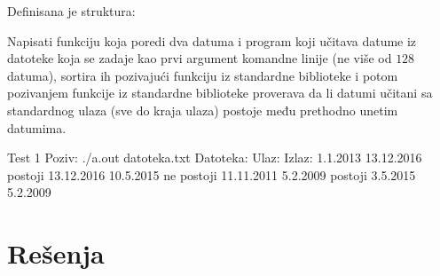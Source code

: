 \begin{Exercise}[label=525]
  Definisana je struktura:
  \begin{ckod}
    typedef struct { int dan; int mesec; int godina; } Datum;}
  \end{ckod}
  Napisati funkciju koja poredi dva datuma i program koji učitava
  datume iz datoteke koja se zadaje kao prvi argument komandne linije
  (ne više od $128$ datuma), sortira ih pozivajući funkciju
   iz standardne biblioteke i potom pozivanjem funkcije
   iz standardne biblioteke proverava da li datumi
  učitani sa standardnog ulaza (sve do kraja ulaza) postoje među
  prethodno unetim datumima.
  
\begin{maxitest}
\begin{test}{Test 1}
Poziv: ./a.out datoteka.txt
Datoteka:            Ulaz:             Izlaz:
1.1.2013             13.12.2016        postoji
13.12.2016           10.5.2015         ne postoji
11.11.2011           5.2.2009          postoji
3.5.2015
5.2.2009
\end{test}
\end{maxitest}
  
\end{Exercise}


\section{Rešenja}
\shipoutAnswer


